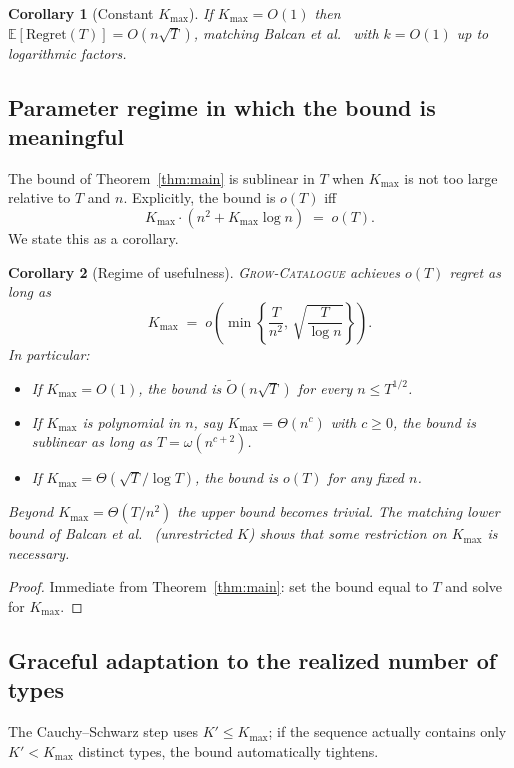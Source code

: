 \documentclass[11pt]{article}
\newtheorem{corollary}{Corollary}
\newcommand{\EE}{\mathbb{E}}
\newcommand{\Kmax}{K_{\max}}
\begin{document}
\begin{corollary}[Constant $\Kmax$]\label{cor:const}
If $\Kmax = O(1)$ then $\EE[\mathrm{Regret}(T)] = O(n\sqrt{T})$, matching Balcan et al.\ \cite[Theorem 5.1]{balcan2015} with $k=O(1)$ up to logarithmic factors.
\end{corollary}

\subsection{Parameter regime in which the bound is meaningful}
\label{sec:regime}

The bound of Theorem~\ref{thm:main} is sublinear in $T$ when $\Kmax$ is not too large relative to $T$ and $n$. Explicitly, the bound is $o(T)$ iff
\[
\Kmax \cdot (n^2 + \Kmax\log n) \;=\; o(T).
\]
We state this as a corollary.

\begin{corollary}[Regime of usefulness]\label{cor:regime}
\textsc{Grow-Catalogue} achieves $o(T)$ regret as long as
\[
\Kmax \;=\; o\!\left(\min\!\left\{\frac{T}{n^2},\,\sqrt{\frac{T}{\log n}}\right\}\right).
\]
In particular:
\begin{itemize}[leftmargin=*]
  \item If $\Kmax = O(1)$, the bound is $\tilde O(n\sqrt T)$ for every $n \le T^{1/2}$.
  \item If $\Kmax$ is polynomial in $n$, say $\Kmax = \Theta(n^c)$ with $c \ge 0$, the bound is sublinear as long as $T = \omega(n^{c+2})$.
  \item If $\Kmax = \Theta(\sqrt{T}/\log T)$, the bound is $o(T)$ for any fixed $n$.
\end{itemize}
Beyond $\Kmax = \Theta(T/n^2)$ the upper bound becomes trivial. The matching lower bound of Balcan et al.\ \cite[Theorem 7.1]{balcan2015} (unrestricted $K$) shows that \emph{some} restriction on $\Kmax$ is necessary.
\end{corollary}

\begin{proof}
Immediate from Theorem~\ref{thm:main}: set the bound equal to $T$ and solve for $\Kmax$.
\end{proof}

\subsection{Graceful adaptation to the realized number of types}

The Cauchy--Schwarz step uses $K' \le \Kmax$; if the sequence actually contains only $K' < \Kmax$ distinct types, the bound automatically tightens.
\end{document}
